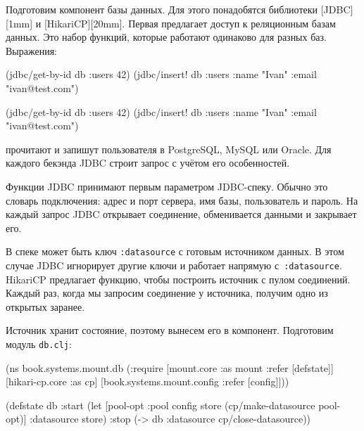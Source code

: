 Подготовим компонент базы данных. Для этого понадобятся библиотеки
[JDBC][1mm] и
[HikariCP][20mm]. Первая предлагает доступ
к реляционным базам данных. Это набор функций, которые работают одинаково для
разных баз. Выражения:

\ifnarrow

\begin{english}
  \begin{clojure}
(jdbc/get-by-id db :users 42)
(jdbc/insert! db :users
  {:name "Ivan" :email "ivan@test.com"})
  \end{clojure}
\end{english}

\else

\begin{english}
  \begin{clojure}
(jdbc/get-by-id db :users 42)
(jdbc/insert! db :users {:name "Ivan" :email "ivan@test.com"})
  \end{clojure}
\end{english}

\fi

\noindent
прочитают и запишут пользователя в Postgre\-SQL, MySQL или Oracle. Для каждого
бекэнда JDBC строит запрос с учётом его особенностей.


Функции JDBC принимают первым параметром JDBC-спеку. Обычно это словарь
подключения: адрес и порт сервера, имя базы, пользователь и пароль. На каждый
запрос JDBC открывает соединение, обменивается данными и закрывает его.

В спеке может быть ключ \verb|:datasource| с готовым источником данных. В этом случае
JDBC игнорирует другие ключи и работает напрямую с~\verb|:datasource|. HikariCP
предлагает функцию, чтобы построить источник с пулом соединений. Каждый раз,
когда мы запросим соединение у источника, получим одно из открытых заранее.


Источник хранит состояние, поэтому вынесем его в компонент. Подготовим модуль
\verb|db.clj|:

\ifnarrow

\begin{english}
  \begin{clojure}
(ns book.systems.mount.db
  (:require
   [mount.core :as mount
    :refer [defstate]]
   [hikari-cp.core :as cp]
   [book.systems.mount.config
    :refer [config]]))

(defstate db
  :start
  (let [{pool-opt :pool} config
        store (cp/make-datasource
                pool-opt)]
    {:datasource store})
  :stop
  (-> db
      :datasource
      cp/close-datasource))
  \end{clojure}
\end{english}

